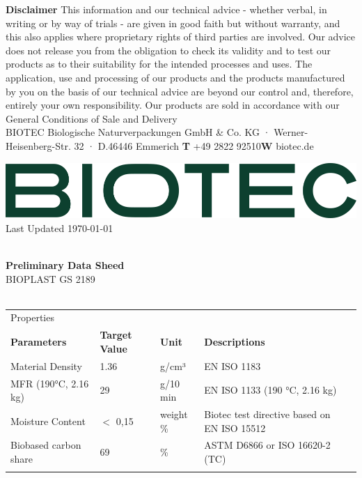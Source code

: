\documentclass{article}
\begin{document}
\vspace*{\fill}
{\scriptsize
        \textbf{Disclaimer} This information and our technical advice - whether verbal, in writing or by way of trials - are given in good faith but without warranty, and this also applies where proprietary rights of third parties are involved. Our advice does not release you from the obligation to check its validity and to test our products as to their suitability for the intended processes and uses. The application, use and processing of our products and the products manufactured by you on the basis of our technical advice are beyond our control and, therefore, entirely your own responsibility. Our products are sold in accordance with our General Conditions of Sale and Delivery \\ 
 BIOTEC Biologische Naturverpackungen GmbH \& Co. KG · Werner-Heisenberg-Str. 32 · D.46446 Emmerich \hfill \textbf{T} +49 2822 92510\qquad \textbf{W} biotec.de}
\clearpage
\begin{flushleft}
\includegraphics[scale=0.20]{biotec}
\hfill\tiny Last Updated \today
\end{flushleft}
\begin{flushleft}
\hspace{1cm}\\
\textbf{Preliminary Data Sheed}\\
BIOPLAST GS 2189\\
\hspace{1cm}\\
\end{flushleft}
\begin{center}
\begin{tabularx}
{\textwidth}{X l  l  l  l }\rowcolor{color_title}Properties &  &  &  &  \\
\textbf{Parameters} & \textbf{Target Value} & \textbf{Unit} & \textbf{Descriptions} &  \\
Material Density  & 1.36 & g/cm³ & EN ISO 1183 &  \\
\arrayrulecolor{line_color}\hline
MFR (190°C, 2.16 kg) & 29 & g/10 min & EN ISO 1133 (190 °C, 2.16 kg) &  \\
\arrayrulecolor{line_color}\hline
Moisture Content & \(<\) 0,15 & weight \% & Biotec test directive based on EN ISO 15512 &  \\
\arrayrulecolor{line_color}\hline
Biobased carbon share & 69 & \% & ASTM D6866 or ISO 16620-2 (TC) &  \\
\arrayrulecolor{line_color}\hline

\end{tabularx}
\end{center}
\end{document}
